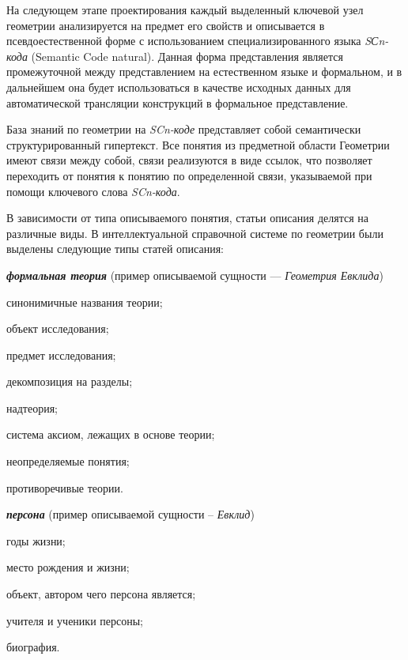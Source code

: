 На следующем этапе проектирования каждый выделенный ключевой узел геометрии анализируется на предмет его свойств и описывается в псевдоестественной форме с использованием специализированного языка \textit{SСn-кода} (Semantic Code natural). Данная форма представления является промежуточной между представлением на естественном языке и формальном, и в дальнейшем она будет использоваться в качестве исходных данных для автоматической трансляции конструкций в формальное представление.

База знаний по геометрии на \textit{SCn-коде} представляет собой семантически структурированный гипертекст. Все понятия из предметной области Геометрии имеют связи между собой, связи реализуются в виде ссылок, что позволяет переходить от понятия к понятию по определенной связи, указываемой при помощи ключевого слова \textit{SCn-кода}.

В зависимости от типа описываемого понятия, статьи описания делятся на различные виды. В интеллектуальной справочной системе по геометрии были выделены следующие типы статей описания:

\textbf{\textit{формальная теория}} (пример описываемой сущности --- \textit{Геометрия Евклида})

\begin{textitemize}
	\item синонимичные названия теории;
	\item объект исследования;
	\item предмет исследования;
	\item декомпозиция на разделы;
	\item надтеория;
	\item система аксиом, лежащих в основе теории;
	\item неопределяемые понятия;
	\item противоречивые теории.
\end{textitemize}

\textbf{\textit{персона}} (пример описываемой сущности -- \textit{Евклид})

\begin{textitemize}
	\item годы жизни;
	\item место рождения и жизни;
	\item объект, автором чего персона является;
	\item учителя и ученики персоны;
	\item биография.
\end{textitemize}

